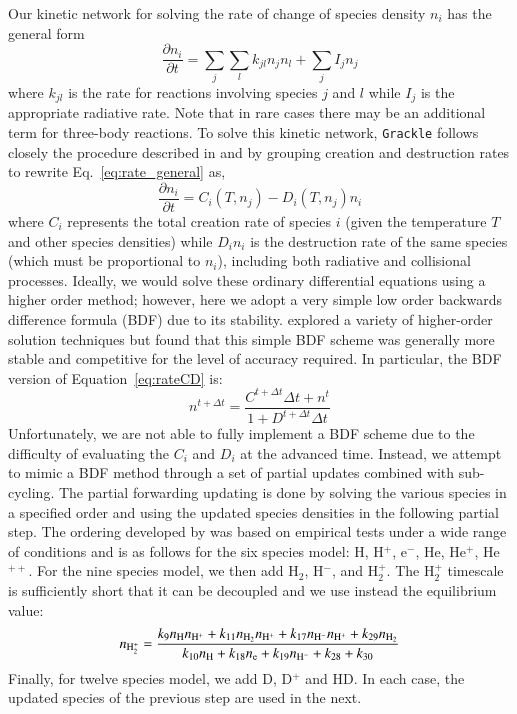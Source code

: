 Our kinetic network for solving the rate of change of species density $n_i$ has the general form
\begin{equation}
\frac{\partial n_i}{\partial t} = \sum_j \sum_l k_{jl} n_j n_l + \sum_j I_j n_j
\label{eq:rate_general}
\end{equation}
where $k_{jl}$ is the rate for reactions involving species $j$ and $l$ while $I_j$ is the appropriate radiative rate.  Note that in rare cases there may be an additional term for three-body reactions.   To solve this kinetic network, \texttt{Grackle} follows closely the procedure described in \citet{1997NewA....2..209A} and \citet{2014ApJS..211...19B} by grouping creation and destruction rates to rewrite Eq.~\ref{eq:rate_general} as,
\begin{equation}
\frac{\partial n_i}{\partial t} = C_i(T, n_j) - D_i(T, n_j) n_i
\label{eq:rateCD}
\end{equation}
where $C_i$ represents the total creation rate of species $i$ (given the temperature $T$ and other species densities) while $D_i n_i$ is the destruction rate of the same species (which must be proportional to $n_i$), including both radiative and collisional processes.  Ideally, we would solve these ordinary differential equations using a higher order method; however, here we adopt a very simple low order backwards difference formula (BDF) due to its stability.  \citet{1997NewA....2..209A} explored a variety of higher-order solution techniques but found that this simple BDF scheme was generally more stable and competitive for the level of accuracy required.  In particular, the BDF version of Equation~\ref{eq:rateCD} is:
\begin{equation}
n^{t + \Delta t} = \frac{C^{t+\Delta t} \Delta t + n^t}{1 + D^{t+\Delta t} \Delta t}
\label{eq:rate_BDF}
\end{equation}
Unfortunately, we are not able to fully implement a BDF scheme due to
the difficulty of evaluating the $C_i$ and $D_i$ at the advanced time.
Instead, we attempt to mimic a BDF method through a set of partial
updates combined with sub-cycling.  The partial forwarding updating is
done by solving the various species in a specified order and using
the updated species densities in the following partial step.  The
ordering developed by \citet{1997NewA....2..209A} was based on empirical tests under a wide range of conditions and is as follows for the six species model: H, H$^+$, e$^-$, He, He$^+$, He$^{++}$.  For the nine species model, we then add H$_2$, H$^-$, and H$_2^+$.  The H$_2^+$ timescale is sufficiently short that it can be decoupled and we use instead the equilibrium value:
\begin{equation}
n_{ {\rm H}_2^+} = \frac{k_9 n_{\rm H} n_{\rm H^+} + k_{11} n_{\rm H_2} n_{\rm H^+} + k_{17} n_{\rm H^-} n_{\rm H^+} + k_{29} n_{\rm H_2}}
   {k_{10} n_{\rm H} + k_{18} n_{\rm e} + k_{19} n_{\rm H^-} + k_{28} + k_{30}}
\end{equation}
Finally, for twelve species model, we add D, D$^+$ and HD.  In each case, the updated species of the previous step are used in the next.  

